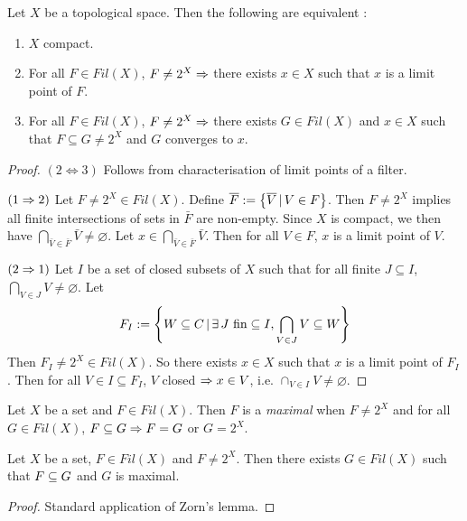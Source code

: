 \documentclass[main.tex]{subfiles}
\begin{document}
\begin{thm} 
  
  Let $X$ be a topological space. 
  Then the following are equivalent : 
  \begin{enumerate}
    \item $X$ compact. 
    \item For all $F \in Fil(X)$,
    $F \neq 2^X \Rightarrow$
    there exists $x \in X$ such that $x$ is a limit point of $F$.
    \item For all $F \in Fil(X)$,
    $F \neq 2^X \Rightarrow$
    there exists $G \in Fil(X)$ and $x \in X$
    such that $F \subseteq G \neq 2^X$ and $G$ converges to $x$.
  \end{enumerate}
\end{thm}
\begin{proof}
  $(2 \iff 3)$ Follows from characterisation of limit points of a filter.

  $(1\Rightarrow 2)$ 
  Let $F \neq 2^X \in Fil(X)$.
  Define $\overline{F} := \left\{\overline{V}\,|\, V \in F\right\}$.
  Then $F \neq 2^X$ implies 
  all finite intersections of sets in $\bar{F}$ are non-empty. 
  Since $X$ is compact, 
  we then have $\bigcap_{\bar{V} \in \bar{F}} \bar{V} \neq \varnothing$.
  Let $x \in \bigcap_{\bar{V} \in \bar{F}} \bar{V}$.
  Then for all $V \in F$, $x$ is a limit point of $V$.

  $(2\Rightarrow 1)$ Let $I$ be a set of closed subsets of $X$
  such that for all finite $J \subseteq I$, 
  $\bigcap_{V \in J} V \neq \varnothing$.
  Let \[
    F_I := \left\{
      W \subseteq C \,|\, \exists\, J\text{ fin} \subseteq I, 
      \bigcap_{V \in J} V \subseteq W
    \right\}
  \]
  Then $F_I \neq 2^X \in Fil(X)$.
  So there exists $x \in X$
  such that $x$ is a limit point of $F_I$.
  Then for all $V \in I \subseteq F_I$, 
  $V$ closed $\Rightarrow x \in V$,
  i.e. $\cap_{V \in I} V \neq \varnothing$.
\end{proof}

\begin{dfn} 
  
  Let $X$ be a set and $F \in Fil(X)$.
  Then $F$ is a \emph{maximal} when 
  $F \neq 2^X$ and for all $G \in Fil(X)$, 
  $F \subseteq G \Rightarrow F = G$ or $G = 2^X$. 
\end{dfn}

\begin{lem} 
  
  Let $X$ be a set, $F \in Fil(X)$ and $F \neq 2^X$.
  Then there exists $G \in Fil(X)$ such that 
  $F \subseteq G$ and $G$ is maximal.
\end{lem}
\begin{proof}
  Standard application of Zorn's lemma.
\end{proof}
\end{document}
